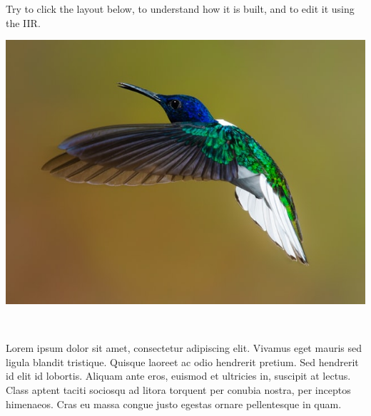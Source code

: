\documentclass[11pt, a4paper]{article}
\begin{document}
\begin{example}
    Try to click the layout below, to understand how it is built, and to edit it using the IIR.

    \begin{gridlayout}{\textwidth}{11cm}
        \begin{row}{0.65}
            \begin{cell}{0.65}
                \includegraphics[width=\cellwidth]{img/bird.jpg}
            \end{cell}
            \begin{cell}{0.05}
                ~
            \end{cell}
            \begin{cell}{0.3}
                Lorem ipsum dolor sit amet, consectetur adipiscing elit. Vivamus eget mauris sed ligula blandit tristique. Quisque laoreet ac odio hendrerit pretium. Sed hendrerit id elit id lobortis. Aliquam ante eros, euismod et ultricies in, suscipit at lectus. Class aptent taciti sociosqu ad litora torquent per conubia nostra, per inceptos himenaeos. Cras eu massa congue justo egestas ornare pellentesque in quam.
            \end{cell}
        \end{row}
        \begin{row}{0.05}
            \begin{cell}{1}
                ~ 
            \end{cell}
        \end{row}
        \begin{row}{0.3}
            \begin{cell}{0.3}

\end{cell}
\end{row}
\end{gridlayout}
\end{example}
\end{document}
